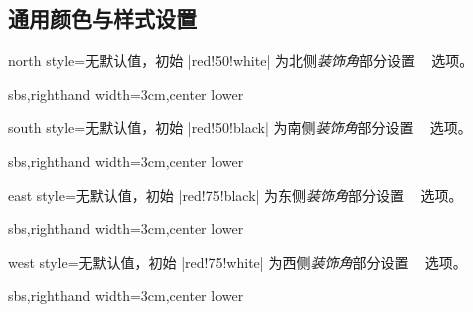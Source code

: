 \subsection{通用颜色与样式设置}\label{subsec:vignettestyle}

\begin{vigTcbKey}[][doc new=2016-04-22]{north style}{=}{无默认值，初始 |red!50!white|}
  为北侧\emph{装饰角}部分设置 \tikzname\  选项。
\begin{dispExample*}{sbs,righthand width=3cm,center lower}
\end{dispExample*}
\end{vigTcbKey}

\begin{vigTcbKey}[][doc new=2016-04-22]{south style}{=}{无默认值，初始 |red!50!black|}
  为南侧\emph{装饰角}部分设置 \tikzname\  选项。
\begin{dispExample*}{sbs,righthand width=3cm,center lower}
\end{dispExample*}
\end{vigTcbKey}


\begin{vigTcbKey}[][doc new=2016-04-22]{east style}{=}{无默认值，初始 |red!75!black|}
  为东侧\emph{装饰角}部分设置 \tikzname\  选项。
\begin{dispExample*}{sbs,righthand width=3cm,center lower}
\end{dispExample*}
\end{vigTcbKey}

\clearpage

\begin{vigTcbKey}[][doc new=2016-04-22]{west style}{=}{无默认值，初始 |red!75!white|}
  为西侧\emph{装饰角}部分设置 \tikzname\  选项。
\begin{dispExample*}{sbs,righthand width=3cm,center lower}
\end{dispExample*}
\end{vigTcbKey}


